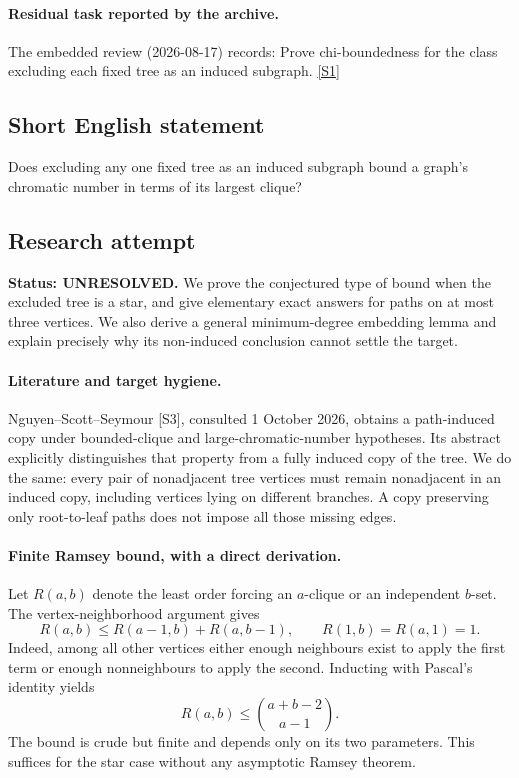 \documentclass[11pt,a4paper]{article}
\newcommand{\sref}[2]{\hyperlink{source:#1:#2}{[S#2]}}
\begin{document}
\paragraph{Residual task reported by the archive.}

The embedded review (2026-08-17) records: Prove chi-boundedness for the class excluding each fixed tree as an induced subgraph. \sref{1397}{1}

\subsection{Short English statement}

Does excluding any one fixed tree as an induced subgraph bound a graph’s chromatic number in terms of its largest clique?

\subsection{Research attempt}
\textbf{Status: UNRESOLVED.} We prove the conjectured type of bound when the excluded tree is a star, and give elementary exact answers for paths on at most three vertices. We also derive a general minimum-degree embedding lemma and explain precisely why its non-induced conclusion cannot settle the target.

\paragraph{Literature and target hygiene.}
Nguyen--Scott--Seymour [S3], consulted 1 October 2026, obtains a path-induced copy under bounded-clique and large-chromatic-number hypotheses. Its abstract explicitly distinguishes that property from a fully induced copy of the tree. We do the same: every pair of nonadjacent tree vertices must remain nonadjacent in an induced copy, including vertices lying on different branches. A copy preserving only root-to-leaf paths does not impose all those missing edges.

\paragraph{Finite Ramsey bound, with a direct derivation.}
Let $R(a,b)$ denote the least order forcing an $a$-clique or an independent $b$-set. The vertex-neighborhood argument gives
\[
R(a,b)\le R(a-1,b)+R(a,b-1),\qquad R(1,b)=R(a,1)=1.
\]
Indeed, among all other vertices either enough neighbours exist to apply the first term or enough nonneighbours to apply the second. Inducting with Pascal's identity yields
\[
R(a,b)\le\binom{a+b-2}{a-1}.
\]
The bound is crude but finite and depends only on its two parameters. This suffices for the star case without any asymptotic Ramsey theorem.
\end{document}
